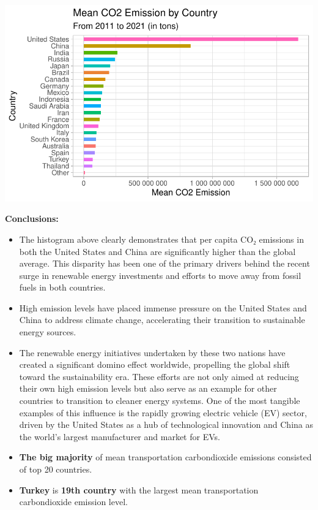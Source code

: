 \documentclass[
  11pt,
  a4paper,
  DIV=11,
  numbers=noendperiod]{scrartcl}
\begin{document}
\includegraphics{analysis_files/figure-pdf/unnamed-chunk-4-1.pdf}

\textbf{Conclusions:}

\begin{itemize}
\item
  The histogram above clearly demonstrates that per capita CO₂ emissions
  in both the United States and China are significantly higher than the
  global average. This disparity has been one of the primary drivers
  behind the recent surge in renewable energy investments and efforts to
  move away from fossil fuels in both countries.
\item
  High emission levels have placed immense pressure on the United States
  and China to address climate change, accelerating their transition to
  sustainable energy sources.
\item
  The renewable energy initiatives undertaken by these two nations have
  created a significant domino effect worldwide, propelling the global
  shift toward the sustainability era. These efforts are not only aimed
  at reducing their own high emission levels but also serve as an
  example for other countries to transition to cleaner energy systems.
  One of the most tangible examples of this influence is the rapidly
  growing electric vehicle (EV) sector, driven by the United States as a
  hub of technological innovation and China as the world's largest
  manufacturer and market for EVs.
\item
  \textbf{The big majority} of mean transportation carbondioxide
  emissions consisted of top 20 countries.
\item
  \textbf{Turkey} is \textbf{19th country} with the largest mean
  transportation carbondioxide emission level.
\end{itemize}
\end{document}
